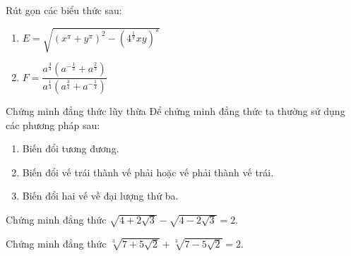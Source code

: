 \begin{bt}%
	Rút gọn các biểu thức sau: 
	\begin{enumerate}
		\item $E=\sqrt{{{\left(x^{\pi}+y^{\pi}\right)}^2-\left({4}^{\tfrac{1}{\pi}}xy\right)}^{\pi}}$
		\item $F=\dfrac{{a}^{\tfrac{4}{3}}\left({a}^{-\tfrac{1}{3}}+{a}^{\tfrac{2}{3}}\right)}{{a}^{\tfrac{1}{4}}\left({a}^{\tfrac{3}{4}}+{a}^{-\tfrac{1}{4}}\right)}$
	\end{enumerate}
\end{bt}
\begin{dang}{Chứng minh đẳng thức lũy thừa}
	Để chứng minh đẳng thức ta thường sử dụng các phương pháp sau:
	\begin{enumerate}
		\item Biến đổi tương đương.
		\item Biến đổi vế trái thành vế phải hoặc vế phải thành vế trái.
		\item Biến đổi hai vế về đại lượng thứ ba.
	\end{enumerate}
\end{dang}
\begin{vd}%
	Chứng minh đẳng thức $\sqrt{4+2\sqrt{3}}-\sqrt{4-2\sqrt{3}}=2$. 
\end{vd}

\begin{vd}%
	Chứng minh đẳng thức $\sqrt[3]{7+5\sqrt{2}}+\sqrt[3]{7-5\sqrt{2}}=2$.
\end{vd}

